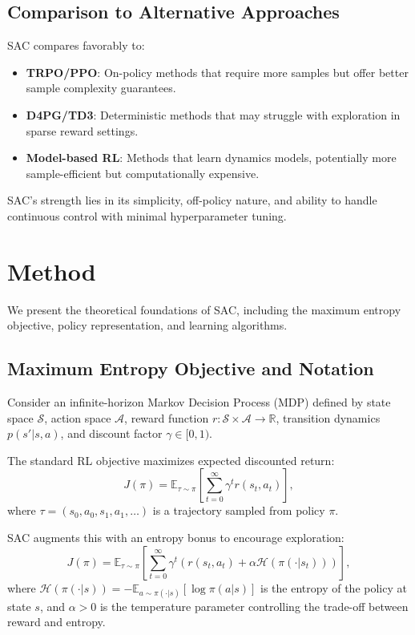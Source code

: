 \documentclass[conference]{IEEEtran}
\begin{document}
\subsection{Comparison to Alternative Approaches}
SAC compares favorably to:
\begin{itemize}
  \item \textbf{TRPO/PPO}: On-policy methods that require more samples but offer better sample complexity guarantees.
  \item \textbf{D4PG/TD3}: Deterministic methods that may struggle with exploration in sparse reward settings.
  \item \textbf{Model-based RL}: Methods that learn dynamics models, potentially more sample-efficient but computationally expensive.
\end{itemize}

SAC's strength lies in its simplicity, off-policy nature, and ability to handle continuous control with minimal hyperparameter tuning.

\section{Method}
We present the theoretical foundations of SAC, including the maximum entropy objective, policy representation, and learning algorithms.

\subsection{Maximum Entropy Objective and Notation}
Consider an infinite-horizon Markov Decision Process (MDP) defined by state space $\mathcal{S}$, action space $\mathcal{A}$, reward function $r: \mathcal{S} \times \mathcal{A} \rightarrow \mathbb{R}$, transition dynamics $p(s'|s,a)$, and discount factor $\gamma \in [0,1)$.

The standard RL objective maximizes expected discounted return:
\begin{equation}
J(\pi) = \mathbb{E}_{\tau \sim \pi} \left[ \sum_{t=0}^{\infty} \gamma^t r(s_t, a_t) \right],
\end{equation}
where $\tau = (s_0, a_0, s_1, a_1, \dots)$ is a trajectory sampled from policy $\pi$.

SAC augments this with an entropy bonus to encourage exploration:
\begin{equation}
J(\pi) = \mathbb{E}_{\tau \sim \pi} \left[ \sum_{t=0}^{\infty} \gamma^t \left( r(s_t, a_t) + \alpha \mathcal{H}(\pi(\cdot|s_t)) \right) \right],
\end{equation}
where $\mathcal{H}(\pi(\cdot|s)) = -\mathbb{E}_{a \sim \pi(\cdot|s)} [\log \pi(a|s)]$ is the entropy of the policy at state $s$, and $\alpha > 0$ is the temperature parameter controlling the trade-off between reward and entropy.
\end{document}
